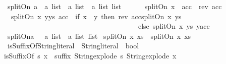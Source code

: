 \begin{isabellebody}
\isanewline
{}\isamarkupfalse%
\ splitOn{\isacharprime}{\kern0pt}{\isacharcolon}{\kern0pt}{\isacharcolon}{\kern0pt}\ {\isachardoublequoteopen}{\isacharprime}{\kern0pt}a\ {\isasymRightarrow}\ {\isacharprime}{\kern0pt}a\ list\ {\isasymRightarrow}\ {\isacharprime}{\kern0pt}a\ list\ {\isasymRightarrow}\ {\isacharprime}{\kern0pt}a\ list\ list{\isachardoublequoteclose}\ \ \ \isanewline
\ \ \ {\isachardoublequoteopen}splitOn{\isacharprime}{\kern0pt}\ x\ {\isacharbrackleft}{\kern0pt}{\isacharbrackright}{\kern0pt}\ acc\ {\isacharequal}{\kern0pt}\ {\isacharbrackleft}{\kern0pt}rev\ acc{\isacharbrackright}{\kern0pt}{\isachardoublequoteclose}\isanewline
\ {\isacharbar}{\kern0pt}\ {\isachardoublequoteopen}splitOn{\isacharprime}{\kern0pt}\ x\ {\isacharparenleft}{\kern0pt}y{\isacharhash}{\kern0pt}ys{\isacharparenright}{\kern0pt}\ acc\ {\isacharequal}{\kern0pt}\ {\isacharparenleft}{\kern0pt}if\ x\ {\isacharequal}{\kern0pt}\ y\ then\ {\isacharparenleft}{\kern0pt}rev\ acc{\isacharparenright}{\kern0pt}{\isacharhash}{\kern0pt}{\isacharparenleft}{\kern0pt}splitOn{\isacharprime}{\kern0pt}\ x\ ys\ {\isacharbrackleft}{\kern0pt}{\isacharbrackright}{\kern0pt}{\isacharparenright}{\kern0pt}\isanewline
\ \ \ \ \ \ \ \ \ \ \ \ \ \ \ \ \ \ \ \ \ \ \ \ \ \ \ \ \ \ \ \ \ \ \ \ \ \ else\ splitOn{\isacharprime}{\kern0pt}\ x\ ys\ {\isacharparenleft}{\kern0pt}y{\isacharhash}{\kern0pt}acc{\isacharparenright}{\kern0pt}{\isacharparenright}{\kern0pt}{\isachardoublequoteclose}\isanewline
\isanewline
{}\isamarkupfalse%
\ splitOn{\isacharcolon}{\kern0pt}{\isacharcolon}{\kern0pt}{\isachardoublequoteopen}{\isacharprime}{\kern0pt}a\ \ {\isasymRightarrow}\ {\isacharprime}{\kern0pt}a\ list\ {\isasymRightarrow}\ {\isacharprime}{\kern0pt}a\ list\ list{\isachardoublequoteclose}\ \isanewline
{\isachardoublequoteopen}splitOn\ x\ xs\ {\isacharequal}{\kern0pt}\ splitOn{\isacharprime}{\kern0pt}\ x\ xs\ {\isacharbrackleft}{\kern0pt}{\isacharbrackright}{\kern0pt}{\isachardoublequoteclose}\isanewline
\isanewline
{}\isamarkupfalse%
\ isSuffixOf{\isacharcolon}{\kern0pt}{\isacharcolon}{\kern0pt}{\isachardoublequoteopen}String{\isachardot}{\kern0pt}literal\ {\isasymRightarrow}\ String{\isachardot}{\kern0pt}literal\ {\isasymRightarrow}\ bool{\isachardoublequoteclose}\ \isanewline
{\isachardoublequoteopen}isSuffixOf\ s\ x\ {\isacharequal}{\kern0pt}\ suffix\ {\isacharparenleft}{\kern0pt}String{\isachardot}{\kern0pt}explode\ s{\isacharparenright}{\kern0pt}\ {\isacharparenleft}{\kern0pt}String{\isachardot}{\kern0pt}explode\ x{\isacharparenright}{\kern0pt}{\isachardoublequoteclose}\isanewline

\end{isabellebody}
